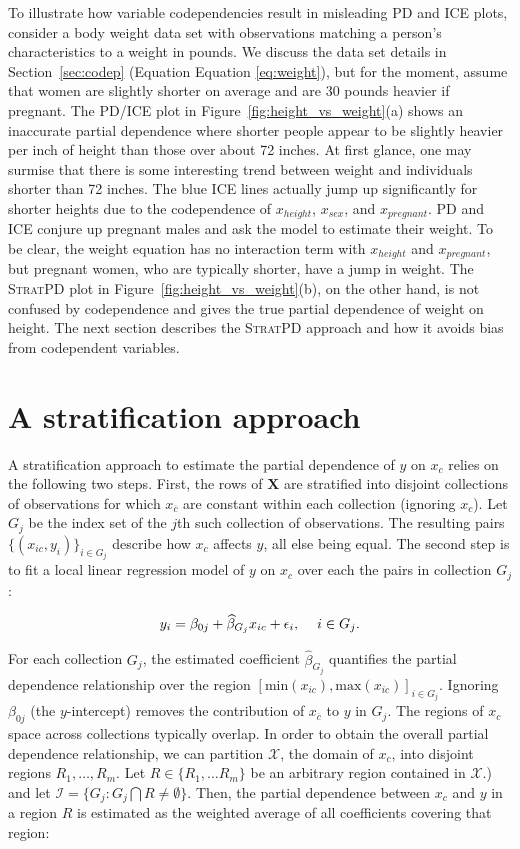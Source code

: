 \documentclass[12pt]{article}
\newcommand{\secref}[1]{Section~\ref{#1}}
\newcommand{\figref}[1]{Figure~\ref{#1}}
\newcommand{\spd}{\fontfamily{cmr}\textsc{\small StratPD}}
\newcommand{\xnc}{$x_{\overline{c}}$}
\begin{document}
To illustrate how variable codependencies result in misleading PD and ICE plots, consider a body weight data set with observations matching a person's characteristics to a weight in pounds. We discuss the data set details in \secref{sec:codep} (Equation Equation \eqref{eq:weight}), but for the moment, assume that women are slightly shorter on average and are 30 pounds heavier if pregnant. The PD/ICE plot in \figref{fig:height_vs_weight}(a) shows an inaccurate partial dependence where shorter people appear to be slightly heavier per inch of height than those over about 72 inches. At first glance, one may surmise that there is some interesting trend between weight and individuals shorter than 72 inches. The blue ICE lines actually jump up significantly for shorter heights due to the codependence of $x_{height}$, $x_{sex}$, and $x_{pregnant}$. PD and ICE conjure up pregnant males and ask the model to estimate their weight. To be clear, the weight equation has no interaction term with $x_{height}$ and $x_{pregnant}$, but pregnant women, who are typically shorter, have a jump in weight. The \spd{} plot in \figref{fig:height_vs_weight}(b), on the other hand, is not confused by codependence and gives the true partial dependence of weight on height.   The next section describes the \spd{} approach and how it avoids bias from codependent variables.

\section{A stratification approach}

A stratification approach to estimate the partial dependence of $y$ on $x_c$ relies on the following two steps. First, the rows of $\mathbf{X}$ are stratified into disjoint collections of observations for which \xnc{} are constant within each collection (ignoring $x_c$). Let $G_j$ be the index set of the $j$th such collection of observations. The resulting pairs $\{(x_{ic},  y_i)\}_{i \in G_j}$ describe how $x_c$ affects $y$, all else being equal. The second step is to fit a local linear regression model of $y$ on $x_c$ over each the pairs in collection $G_j$:

$$y_i = \beta_{0j} + \widehat{\beta}_{G_j} x_{ic} + \epsilon_i, \hskip 1pc i \in G_j.$$

For each collection $G_j$, the estimated coefficient $\widehat{\beta}_{G_j}$ quantifies the partial dependence relationship over the region $[\text{min}(x_{ic}), \text{max}(x_{ic})]_{i \in G_j}$. Ignoring $\beta_{0j}$ (the $y$-intercept) removes the contribution of \xnc{} to $y$ in $G_j$. The regions of $x_c$ space across collections typically overlap.  In order to obtain the overall partial dependence relationship, we can partition $\mathcal{X}$, the domain of $x_c$, into disjoint regions $R_1, \ldots, R_m$. Let $R \in \{R_1, \ldots R_m\}$ be an arbitrary region contained in $\mathcal{X}.$) and let $\mathcal{I} = \{G_j: G_j \bigcap R \neq \emptyset\}$. Then, the partial dependence between $x_c$ and $y$ in a region $R$ is estimated as the weighted average of all coefficients covering that region: 
\end{document}
